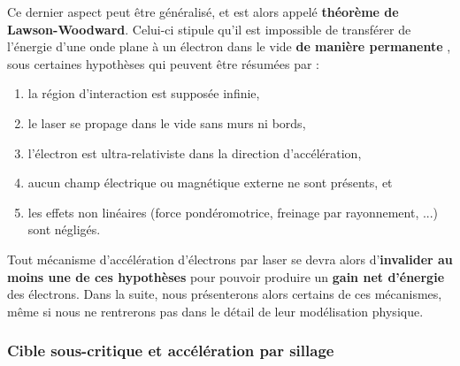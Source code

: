 \begin{refsection}
Ce dernier aspect peut être généralisé, et est alors appelé \textbf{théorème de Lawson-Woodward}. Celui-ci stipule qu'il est impossible de transférer de l'énergie d'une onde plane à un électron dans le vide \textbf{de manière permanente} \parencite{esarey_2009, zaim_phd, gibbon_2013}, sous certaines hypothèses qui peuvent être résumées par \parencite{esarey_2009} :
\begin{enumerate}
\def\labelenumi{\arabic{enumi}.}
    \item la région d'interaction est supposée infinie,
    \item le laser se propage dans le vide sans murs ni bords,
    \item l'électron est ultra-relativiste dans la direction d'accélération,
    \item aucun champ électrique ou magnétique externe ne sont présents, et
    \item les effets non linéaires (force pondéromotrice, freinage par rayonnement, ...) sont négligés.
\end{enumerate}

Tout mécanisme d'accélération d'électrons par laser se devra alors d'\textbf{invalider au moins une de ces hypothèses} pour pouvoir produire un \textbf{gain net d'énergie} des électrons. 
Dans la suite, nous présenterons alors certains de ces mécanismes, même si nous ne rentrerons pas dans le détail de leur modélisation physique.

\subsubsection{Cible sous-critique et accélération par sillage}


\end{refsection}
